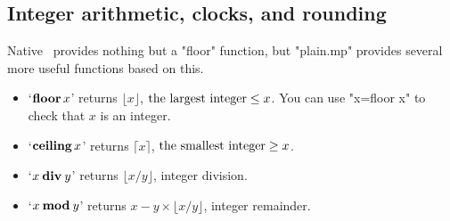 \documentclass[a4paper,landscape]{article}
\def\kw#1{\begingroup\def\_{\kern.04em
    \vbox{\hrule width.3em height .6pt}\kern.08em}%
\ifmmode\mathop{\textbf{#1}}\else\hbox{\bf#1\/}\fi\endgroup}
\begin{document}
\newpage
\subsection{Integer arithmetic, clocks, and rounding}

Native \MP\ provides nothing but a "floor" function, but "plain.mp" provides several
more useful functions based on this.
\begin{itemize}
      \item `$\mathop{\kw{floor}} x$' returns $\lfloor x\rfloor$, $\hbox{the
          largest integer} \le x$.  You can use "x=floor x" to check that $x$ is an
          integer.
    \item `$\mathop{\kw{ceiling}} x$' returns $\lceil  x\rceil$,  $\hbox{the
        smallest integer} \ge x$.

    \item `$x \mathbin{\kw{div}} y$' returns          $\lfloor x/y \rfloor$, integer
        division.
    \item `$x \mathbin{\kw{mod}} y$' returns $x-y\times\lfloor x/y \rfloor$,
        integer remainder.
    
\end{itemize}
\end{document}
